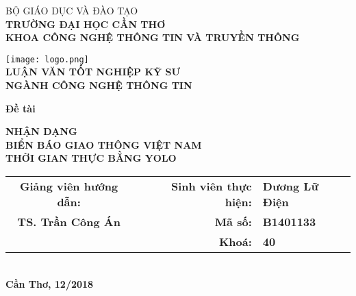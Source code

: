 \documentclass[../thesis.tex]{subfiles}
\begin{document}
\begin{titlepage}

\begin{center}

BỘ GIÁO DỤC VÀ ĐÀO TẠO\\
\textbf{TRƯỜNG ĐẠI HỌC CẦN THƠ\\}
\textbf{KHOA CÔNG NGHỆ THÔNG TIN VÀ TRUYỀN THÔNG\\[1cm]}

\texttt{[image: logo.png]}\\[1cm]

\textbf{LUẬN VĂN TỐT NGHIỆP KỸ SƯ\\}
\textbf{NGÀNH CÔNG NGHỆ THÔNG TIN\\[1.5cm]}

\begin{large}
\textbf{Đề tài\\[0.5cm]}
\end{large}
\textbf{{\LARGE NHẬN DẠNG\\BIỂN BÁO GIAO THÔNG VIỆT NAM\\THỜI GIAN THỰC BẰNG YOLO}}
\\[3.5cm]

\begin{tabular}{ c c r l }
 \textbf{Giảng viên hướng dẫn:} & & \textbf{Sinh viên thực hiện:} & \textbf{Dương Lữ Điện}\\ 
 \textbf{TS. Trần Công Án} & & \textbf{Mã số:} & \textbf{B1401133}\\  
 & & \textbf{Khoá:} & \textbf{40}
\end{tabular}
\\[4cm]

\textbf{Cần Thơ, 12/2018}

\end{center}

\end{titlepage}
\end{document}
